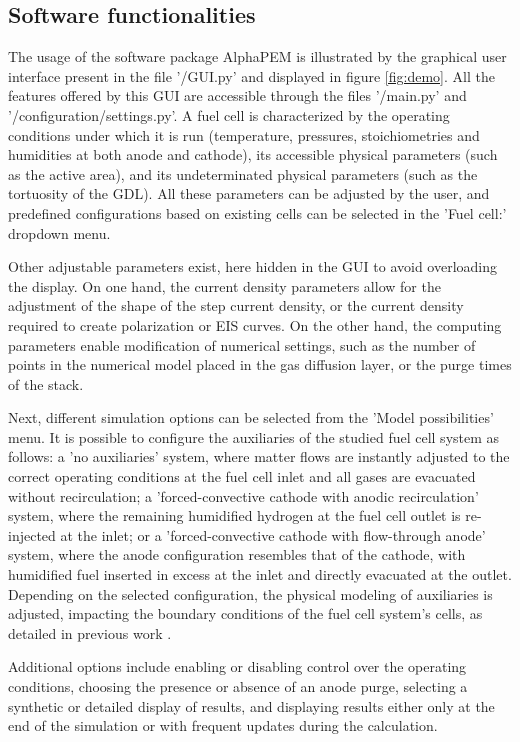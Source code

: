 \documentclass[postprint,3p,times]{elsarticle}
\begin{document}
\subsection{Software functionalities}
\label{subsec:software_functionalities}

The usage of the software package AlphaPEM is illustrated by the graphical user interface present in the file '/GUI.py' and displayed in figure \ref{fig:demo}. All the features offered by this GUI are accessible through the files '/main.py' and '/configuration/settings.py'. A fuel cell is characterized by the operating conditions under which it is run (temperature, pressures, stoichiometries and humidities at both anode and cathode), its accessible physical parameters (such as the active area), and its undeterminated physical parameters (such as the tortuosity of the GDL). All these parameters can be adjusted by the user, and predefined configurations based on existing cells can be selected in the 'Fuel cell:' dropdown menu.

Other adjustable parameters exist, here hidden in the GUI to avoid overloading the display. On one hand, the current density parameters allow for the adjustment of the shape of the step current density, or the current density required to create polarization or EIS curves. On the other hand, the computing parameters enable modification of numerical settings, such as the number of points in the numerical model placed in the gas diffusion layer, or the purge times of the stack.

Next, different simulation options can be selected from the 'Model possibilities' menu. It is possible to configure the auxiliaries of the studied fuel cell system as follows: a 'no auxiliaries' system, where matter flows are instantly adjusted to the correct operating conditions at the fuel cell inlet and all gases are evacuated without recirculation; a 'forced-convective cathode with anodic recirculation' system, where the remaining humidified hydrogen at the fuel cell outlet is re-injected at the inlet; or a 'forced-convective cathode with flow-through anode' system, where the anode configuration resembles that of the cathode, with humidified fuel inserted in excess at the inlet and directly evacuated at the outlet. Depending on the selected configuration, the physical modeling of auxiliaries is adjusted, impacting the boundary conditions of the fuel cell system's cells, as detailed in previous work \cite{gassAdvanced1DPhysicsbased2025}. 

Additional options include enabling or disabling control over the operating conditions, choosing the presence or absence of an anode purge, selecting a synthetic or detailed display of results, and displaying results either only at the end of the simulation or with frequent updates during the calculation.
\end{document}
